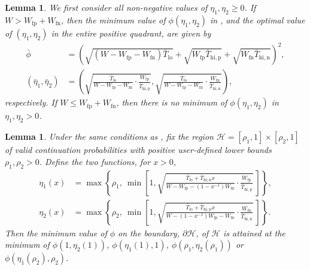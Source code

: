 \documentclass[12pt, onecolumn]{article}
\newcommand{\fp}[1]{#1_{\mathrm{fp}}}
\newcommand{\fn}[1]{#1_{\mathrm{fn}}}
\newtheorem{lemma}[theorem]{Lemma}
\begin{document}
\begin{lemma}
\label{etastar:unbounded}
 We first consider all non-negative values of $\eta_1, \eta_2 \geq 0$. 
 If $W > \fp{W} + \fn{W}$, then the minimum value of $\phi(\eta_1,\eta_2)$ in , and the optimal value of $(\eta_1, \eta_2)$ in the entire positive quadrant, are given by
 \begin{subequations}
 \label{eq:etastar:unbounded}
 \begin{align}
  \bar \phi &= \left( \sqrt{(W - \fp{W} - \fn{W}) \bar T_{\mathrm{lo}}} + \sqrt{\fp{W} \bar T_{\mathrm{hi, p}}} + \sqrt{\fn{W} \bar T_{\mathrm{hi, n}}} \right)^2, \\
  \left( \bar \eta_1, \bar \eta_2 \right) &= \left( 
  	\sqrt{ \frac{\bar T_{\mathrm{lo}}}{W - \fp{W} - \fn{W}} \cdot \frac{\fp{W}}{\bar T_{\mathrm{hi, p}} }},
	\sqrt{ \frac{\bar T_{\mathrm{lo}}}{W - \fp{W} - \fn{W}} \cdot \frac{\fn{W}}{\bar T_{\mathrm{hi, n}} }}
  \right),
 \end{align}
 \end{subequations}
 respectively.
 If $W \leq \fp{W} + \fn{W}$, then there is no minimum of $\phi(\eta_1,\eta_2)$ in $\eta_1, \eta_2 > 0$.
\end{lemma}

\begin{lemma}
\label{etastar:boundary} 
 Under the same conditions as , fix the region $\mathcal H = [\rho_1, 1] \times [\rho_2, 1]$ of valid continuation probabilities with positive user-defined lower bounds $\rho_1, \rho_2 > 0$.
Define the two functions, for $x>0$,
\begin{subequations}
\label{eq:etastar:boundary}
\begin{align}
\eta_1(x) &= \max \left\{ \rho_1, ~\min \left[ 1, 
\sqrt{\frac{\bar T_{\mathrm{lo}} + \bar T_{\mathrm{hi}, \mathrm{n}} x }{W - \fp{W} - (1-x^{-1})\fn{W}} \cdot \frac{\fp{W}}{\bar T_{\mathrm{hi}, \mathrm p}}} ~
\right] \right\}, \\
\eta_2(x) &= \max \left\{ \rho_2, ~\min \left[ 1, 
\sqrt{\frac{\bar T_{\mathrm{lo}} + \bar T_{\mathrm{hi}, \mathrm{p}} x }{W - (1-x^{-1}) \fp{W} - \fn{W}} \cdot \frac{\fn{W}}{\bar T_{\mathrm{hi}, \mathrm n}}} ~
 \right] \right\}.
\end{align}
\end{subequations}
Then the minimum value of $\phi$ on the boundary, $\partial \mathcal H$, of $\mathcal H$ is attained at the minimum of $\phi(1, \eta_2(1))$, $\phi(\eta_1(1), 1)$, $\phi(\rho_1, \eta_2(\rho_1))$ or $\phi(\eta_1(\rho_2), \rho_2)$.
\end{lemma}
 
\end{document}
